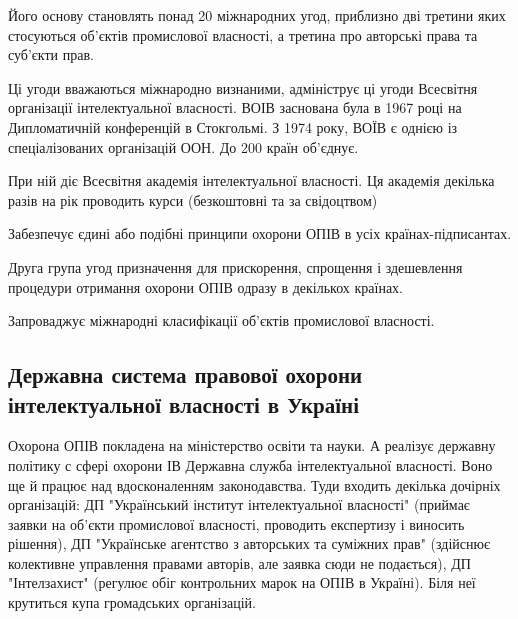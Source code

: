 Його основу становлять понад 20 міжнародних угод, приблизно дві третини яких стосуються об’єктів промислової власності, а третина про авторські права та суб’єкти прав.

Ці угоди вважаються міжнародно визнаними, адмініструє ці угоди Всесвітня організації інтелектуальної власності. ВОІВ заснована була в 1967 році на Дипломатичній конференцій в Стокгольмі. З 1974 року, ВОЇВ є однією із спеціалізованих організацій ООН. До 200 країн об’єднує.

При ній діє Всесвітня академія інтелектуальної власності. Ця академія декілька разів на рік проводить курси (безкоштовні та за свідоцтвом)

Забезпечує єдині або подібні принципи охорони ОПІВ в усіх країнах-підписантах.	

Друга група угод призначення для прискорення, спрощення і здешевлення процедури отримання охорони ОПІВ одразу в декількох країнах.

Запроваджує міжнародні класифікації об’єктів промислової власності.

\subsection{Державна система правової охорони інтелектуальної власності в Україні}
Охорона ОПІВ покладена на міністерство освіти та науки. А реалізує державну політику с сфері охорони ІВ Державна служба інтелектуальної власності. Воно ще й працює над вдосконаленням законодавства. Туди входить декілька дочірніх організацій: ДП "Український інститут інтелектуальної власності" (приймає заявки на об’єкти промислової власності, проводить експертизу і виносить рішення), ДП "Українське агентство з авторських та суміжних прав" (здійснює колективне управлення правами авторів, але заявка сюди не подається), ДП "Інтелзахист" (регулює обіг контрольних марок на ОПІВ в Україні). Біля неї крутиться купа громадських організацій. 